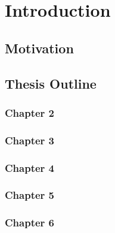 \chapter{Introduction}      \label{Chapter:intro}


\section{Motivation}        \label{Chapter:intro/motivation}


\section{Thesis Outline}    \label{Chapter:intro/outline} 
\subsection{Chapter 2}      \label{Chapter:intro/outline/chapter2}
\subsection{Chapter 3}      \label{Chapter:intro/outline/chapter3}
\subsection{Chapter 4}      \label{Chapter:intro/outline/chapter4}
\subsection{Chapter 5}      \label{Chapter:intro/outline/chapter5}
\subsection{Chapter 6}      \label{Chapter:intro/outline/chapter6}

